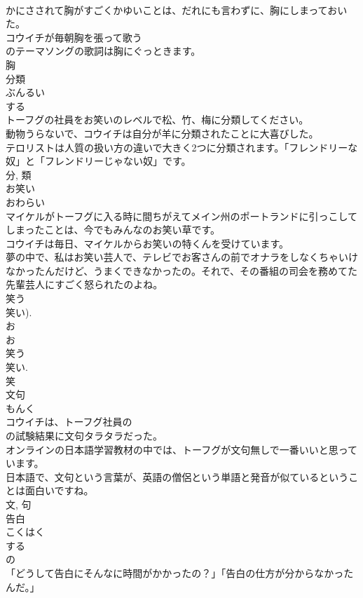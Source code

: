 \documentclass[8pt]{extreport}
\begin{document}
\begin{CJK}{UTF8}{min}
\\	かにさされて胸がすごくかゆいことは、だれにも言わずに、胸にしまっておいた。	
\\	コウイチが毎朝胸を張って歌う
\\	のテーマソングの歌詞は胸にぐっときます。	
\\	胸	
\\	分類	
\\	ぶんるい	
\\	する 
\\	トーフグの社員をお笑いのレベルで松、竹、梅に分類してください。	
\\	動物うらないで、コウイチは自分が羊に分類されたことに大喜びした。	
\\	テロリストは人質の扱い方の違いで大きく2つに分類されます。「フレンドリーな奴」と「フレンドリーじゃない奴」です。	
\\	分, 類	
\\	お笑い	
\\	おわらい	
\\	マイケルがトーフグに入る時に間ちがえてメイン州のポートランドに引っこしてしまったことは、今でもみんなのお笑い草です。	
\\	コウイチは毎日、マイケルからお笑いの特くんを受けています。	
\\	夢の中で、私はお笑い芸人で、テレビでお客さんの前でオナラをしなくちゃいけなかったんだけど、うまくできなかったの。それで、その番組の司会を務めてた先輩芸人にすごく怒られたのよね。	
\\	笑う 
\\	笑い). 
\\	お 
\\	お 
\\	笑う 
\\	笑い. 
\\	笑	
\\	文句	
\\	もんく	
\\	コウイチは、トーフグ社員の
\\	の試験結果に文句タラタラだった。	
\\	オンラインの日本語学習教材の中では、トーフグが文句無しで一番いいと思っています。	
\\	日本語で、文句という言葉が、英語の僧侶という単語と発音が似ているということは面白いですね。	
\\	文, 句	
\\	告白	
\\	こくはく	
\\	する 
\\	の 
\\	「どうして告白にそんなに時間がかかったの？」「告白の仕方が分からなかったんだ。」	

\end{CJK}
\end{document}

